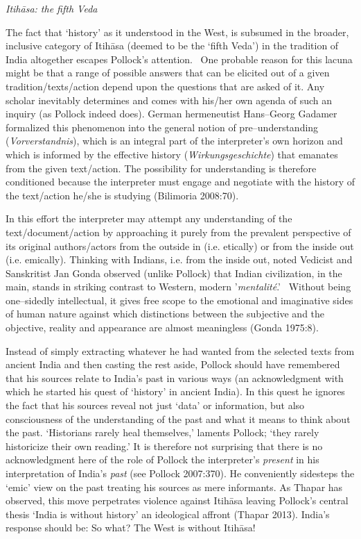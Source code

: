 \textit{Itihāsa: the fifth Veda}

The fact that ‘history’ as it understood in the West, is subsumed in the broader, inclusive category of Itihāsa (deemed to be the ‘fifth Veda’) in the tradition of India altogether escapes Pollock’s attention.  One probable reason for this lacuna might be that a range of possible answers that can be elicited out of a given tradition/texts/action depend upon the questions that are asked of it. Any scholar inevitably determines and comes with his/her own agenda of such an inquiry (as Pollock indeed does). German hermeneutist Hans–Georg Gadamer formalized this phenomenon into the general notion of pre–understanding (\textit{Vorverstandnis}), which is an integral part of the interpreter’s own horizon and which is informed by the effective history (\textit{Wirkungsgeschichte}) that emanates from the given text/action. The possibility for understanding is therefore conditioned because the interpreter must engage and negotiate with the history of the text/action he/she is studying (Bilimoria 2008:70). 

In this effort the interpreter may attempt any understanding of the text/document/action by approaching it purely from the prevalent perspective of its original authors/actors from the outside in (i.e. etically) or from the inside out (i.e. emically). Thinking with Indians, i.e. from the inside out, noted Vedicist and Sanskritist Jan Gonda observed (unlike Pollock) that Indian civilization, in the main, stands in striking contrast to Western, modern '\textit{mentalité}.'  Without being one–sidedly intellectual, it gives free scope to the emotional and imaginative sides of human nature against which distinctions between the subjective and the objective, reality and appearance are almost meaningless (Gonda 1975:8).

Instead of simply extracting whatever he had wanted from the selected texts from ancient India and then casting the rest aside, Pollock should have remembered that his sources relate to India’s past in various ways (an acknowledgment with which he started his quest of ‘history’ in ancient India). In this quest he ignores the fact that his sources reveal not just ‘data’ or information, but also consciousness of the understanding of the past and what it means to think about the past. ‘Historians rarely heal themselves,’ laments Pollock; ‘they rarely historicize their own reading.’ It is therefore not surprising that there is no acknowledgment here of the role of Pollock the interpreter’s \textit{present} in his interpretation of India’s \textit{past} (see Pollock 2007:370). He conveniently sidesteps the ‘emic’ view on the past treating his sources as mere informants. As Thapar has observed, this move perpetrates violence against Itihāsa leaving Pollock’s central thesis ‘India is without history’ an ideological affront (Thapar 2013). India’s response should be: So what? The West is without Itihāsa! 

